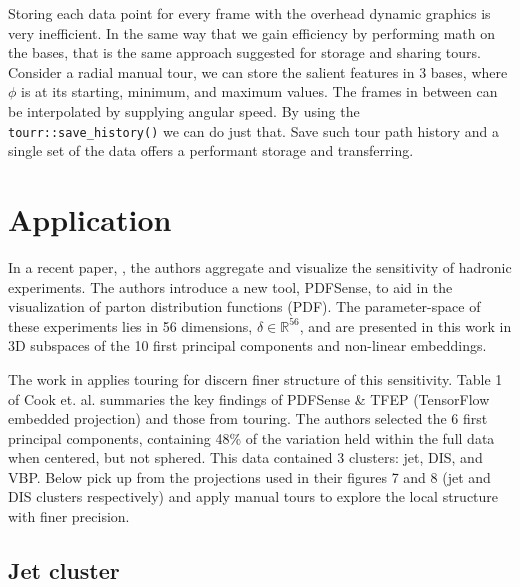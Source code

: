 \documentclass{monashthesis}
\begin{document}
Storing each data point for every frame with the overhead dynamic
graphics is very inefficient. In the same way that we gain efficiency by
performing math on the bases, that is the same approach suggested for
storage and sharing tours. Consider a radial manual tour, we can store
the salient features in 3 bases, where \(\phi\) is at its starting,
minimum, and maximum values. The frames in between can be interpolated
by supplying angular speed. By using the \texttt{tourr::save\_history()}
we can do just that. Save such tour path history and a single set of the
data offers a performant storage and transferring.

\section{Application}\label{sec:application}

In a recent paper, \textcite{wang_visualizing_2018}, the authors
aggregate and visualize the sensitivity of hadronic experiments. The
authors introduce a new tool, PDFSense, to aid in the visualization of
parton distribution functions (PDF). The parameter-space of these
experiments lies in 56 dimensions, \(\delta \in \mathbb{R}^{56}\), and
are presented in this work in 3D subspaces of the 10 first principal
components and non-linear embeddings.

The work in \textcite{cook_dynamical_2018} applies touring for discern
finer structure of this sensitivity. Table 1 of Cook et. al. summaries
the key findings of PDFSense \& TFEP (TensorFlow embedded projection)
and those from touring. The authors selected the 6 first principal
components, containing 48\% of the variation held within the full data
when centered, but not sphered. This data contained 3 clusters: jet,
DIS, and VBP. Below pick up from the projections used in their figures 7
and 8 (jet and DIS clusters respectively) and apply manual tours to
explore the local structure with finer precision.

\subsection{Jet cluster}\label{jet-cluster}
\end{document}
